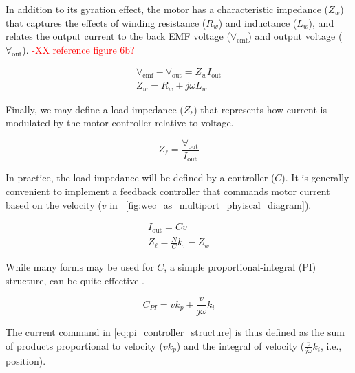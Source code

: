 \documentclass[lettersize,journal]{IEEEtran}
\newcommand{\rc}[1]{\textcolor{red}{#1}}
\begin{document}
\noindent{}In addition to its gyration effect, the motor has a characteristic impedance ($Z_w$) that captures the effects of winding resistance ($R_w$) and inductance ($L_w$), and relates the output current to the back EMF voltage ($\forall_{\textrm{emf}}$) and output voltage ($\forall_{\textrm{out}}$).  \rc{-XX reference figure 6b?}

\begin{subequations}
        \begin{gather}
                \forall_{\textrm{emf}} - \forall_{\textrm{out}} = Z_w I_{\textrm{out}}\\
                Z_w = R_w + j \omega L_w \label{eq:winding_impedance}
        \end{gather}
\end{subequations}

Finally, we may define a load impedance ($Z_\ell$) that represents how current is modulated by the motor controller relative to voltage.

\begin{equation}
        Z_\ell = \frac{\forall_{\textrm{out}}}{I_{\textrm{out}}}
        \label{eq:load_impedance}
\end{equation}

\noindent{}In practice, the load impedance will be defined by a controller ($C$).
It is generally convenient to implement a feedback controller that commands motor current based on the velocity ($v$ in \figurename~\ref{fig:wec_as_multiport_phyiscal_diagram}).

\begin{subequations}
\begin{gather}
        I_{\textrm{out}} = C v \\
        Z_\ell = \frac{N}{C} k_\tau - Z_w     
\end{gather}
\end{subequations}

\noindent{}While many forms may be used for $C$, a simple proportional-integral (PI) structure, can be quite effective \cite{Coe2020a}.

\begin{equation}
        C_{PI} = v k_p + \frac{v}{j \omega} k_i \label{eq:pi_controller_structure}
\end{equation}

\noindent{}The current command in \eqref{eq:pi_controller_structure} is thus defined as the sum of products proportional to velocity ($v k_p$) and the integral of velocity ($\frac{v}{j \omega} k_i$, i.e., position).
\end{document}
